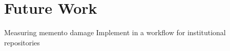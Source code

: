 \chapter{Future Work}
\label{ch:futurework}


Measuring memento damage
Implement in a workflow for institutional repositories